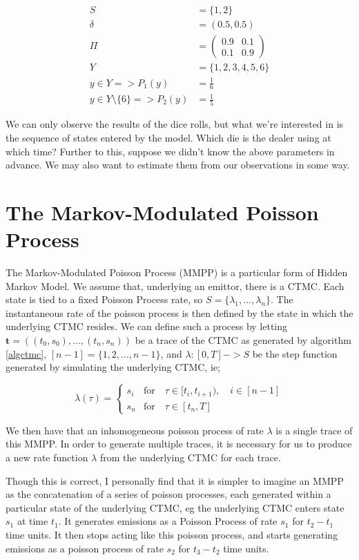 \begin{align*}
S &= \{1,2\}\\
\delta &= (0.5,0.5)\\
\Pi &= 
\left(
	\begin{matrix}
	0.9 & 0.1 \\
	0.1 & 0.9
	\end{matrix}
\right)\\
Y &= \{1,2,3,4,5,6\}\\
y \in Y => P_1(y) &= \frac{1}{6}\\
y \in Y \setminus \{6\} => P_2(y) &= \frac{1}{5}
\end{align*}

We can only observe the results of the dice rolls, but what we're interested in is the sequence of states entered by the model. Which die is the dealer using at which time? Further to this, suppose we didn't know the above parameters in advance. We may also want to estimate them from our observations in some way.

\section{The Markov-Modulated Poisson Process}

The Markov-Modulated Poisson Process (MMPP) is a particular form of Hidden Markov Model. We assume that, underlying an emittor, there is a CTMC. Each state is tied to a fixed Poisson Process rate, so $S = \{\lambda_1,...,\lambda_n\}$. The instantaneous rate of the poisson process is then defined by the state in which the underlying CTMC resides. We can define such a process by letting $\mathbf{t} = ((t_0,s_0),...,(t_n,s_n))$ be a trace of the CTMC as generated by algorithm \ref{algctmc}, $[n-1] = \{1,2,...,n-1\}$, and $\lambda : [0,T]->S$ be the step function generated by simulating the underlying CTMC, ie;

$$
\lambda(\tau) = 
\begin{cases}
	s_i & \mbox{for} \quad \tau \in [t_i,t_{i+1}), \quad i \in [n-1]\\
	s_n & \mbox{for} \quad \tau \in [t_n,T]
\end{cases}
$$

We then have that an inhomogeneous poisson process of rate $\lambda$ is a single trace of this MMPP. In order to generate multiple traces, it is necessary for us to produce a new rate function $\lambda$ from the underlying CTMC for each trace.

Though this is correct, I personally find that it is simpler to imagine an MMPP as the concatenation of a series of poisson processes, each generated within a particular state of the underlying CTMC, eg the underlying CTMC enters state $s_1$ at time $t_1$. It generates emissions as a Poisson Process of rate $s_1$ for $t_2-t_1$ time units. It then stops acting like this poisson process, and starts generating emissions as a poisson process of rate $s_2$ for $t_3-t_2$ time units.

